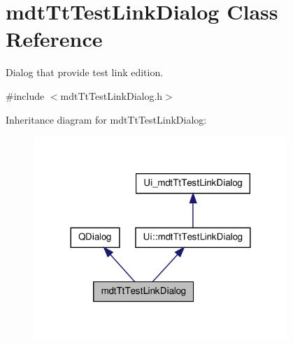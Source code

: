 \hypertarget{classmdt_tt_test_link_dialog}{\section{mdt\-Tt\-Test\-Link\-Dialog Class Reference}
\label{classmdt_tt_test_link_dialog}
}


Dialog that provide test link edition.  




{\ttfamily \#include $<$mdt\-Tt\-Test\-Link\-Dialog.\-h$>$}



Inheritance diagram for mdt\-Tt\-Test\-Link\-Dialog\-:
\nopagebreak
\begin{figure}[H]
\begin{center}
\leavevmode
\includegraphics[width=272pt]{classmdt_tt_test_link_dialog__inherit__graph}
\end{center}
\end{figure}



